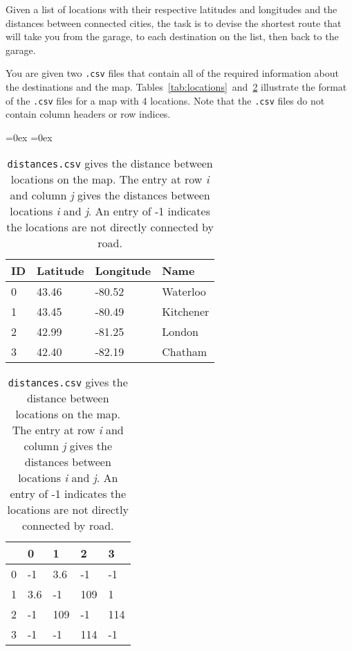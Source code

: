\documentclass[12pt]{article}
\begin{document}
Given a list of locations with their respective latitudes and longitudes and the distances between connected cities, the task is to devise the shortest route that will take you from the garage, to each destination on the list, then back to the garage.

You are given two \texttt{.csv} files that contain all of the required information about the destinations and the map. Tables~\ref{tab:locations}~and~\ref{tab:distances} illustrate the format of the \texttt{.csv} files for a map with 4 locations. Note that the \texttt{.csv} files do not contain column headers or row indices. 

\begin{table}[!htb]
    \aboverulesep=0ex
    \belowrulesep=0ex
    \begin{minipage}{.48\linewidth}
      \centering
        \begin{tabular}{l|lll}
            ID & Latitude & Longitude & Name \\
            \midrule
            0 & 43.46 & -80.52 & Waterloo \\
            1 & 43.45 & -80.49 & Kitchener \\
            2 & 42.99 & -81.25 & London \\
            3 & 42.40 & -82.19 & Chatham \\
        \end{tabular}
        {\small
          \caption{\texttt{locations.csv} gives the latitude, longitude, and name of the destinations. The row index gives the location ID.}                  
          \label{tab:locations}}
          \vspace{40pt}
    \end{minipage}%
    \hfill
    \begin{minipage}{.48\linewidth}
      \centering
        \begin{tabular}{l|llll}
            & 0 & 1 & 2 & 3 \\
            \midrule
            0 & -1 & 3.6 & -1 & -1 \\
            1 & 3.6 & -1 & 109 & 1 \\
            2 & -1 & 109 & -1 & 114 \\
            3 & -1 & -1 & 114 & -1 \\
        \end{tabular}
        {\small \caption{\texttt{distances.csv} gives the distance between locations on the map. The entry at row \textit{i} and column \textit{j} gives the distances between locations \textit{i} and \textit{j}. An entry of -1 indicates the locations are not directly connected by road.}
        \label{tab:distances}}
    \end{minipage} 
\end{table}
\end{document}
